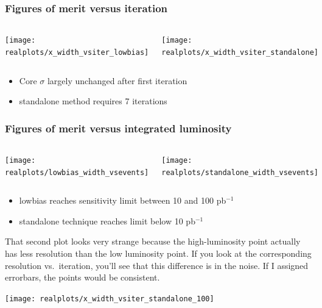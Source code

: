 \documentclass[compress]{beamer}
\begin{document}
\begin{frame}
\frametitle{Figures of merit versus iteration}
\begin{columns}
\begin{center}
\texttt{[image: realplots/x\_width\_vsiter\_lowbias]}
\end{center}
\begin{center}
\texttt{[image: realplots/x\_width\_vsiter\_standalone]}
\end{center}
\end{columns}
\begin{itemize}
\item Core $\sigma$ largely unchanged after first iteration
\item standalone method requires 7 iterations
\end{itemize}
\end{frame}

\begin{frame}
\frametitle{Figures of merit versus integrated luminosity}
\begin{columns}
\begin{center}
\texttt{[image: realplots/lowbias\_width\_vsevents]}
\end{center}
\begin{center}
\texttt{[image: realplots/standalone\_width\_vsevents]}
\end{center}
\end{columns}
\begin{itemize}
\item lowbias reaches sensitivity limit between 10 and 100 pb$^{-1}$
\item standalone technique reaches limit below 10 pb$^{-1}$
\end{itemize}
\end{frame}

\begin{notes}
\item That second plot looks very strange because the high-luminosity
point actually has less resolution than the low luminosity point.  If
you look at the corresponding resolution vs.\ iteration, you'll see
that this difference is in the noise.  If I assigned errorbars, the
points would be consistent.

\texttt{[image: realplots/x\_width\_vsiter\_standalone\_100]}
\end{notes}
\end{document}
